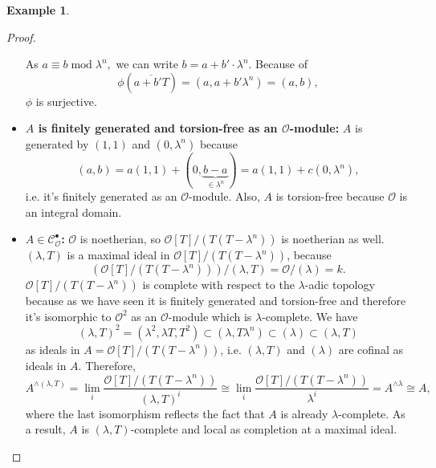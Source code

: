 \documentclass{article}
\theoremstyle{plain}%
\theoremstyle{definition}
\newtheorem{example}[theorem]{Example}
\theoremstyle{remark}
\newcommand{\cob}{\mathcal{C}_\mathcal{O}^\bullet}
\begin{document}
\begin{example}
\begin{proof}
\begin{itemize}
                As \(a \equiv b \operatorname{mod} \lambda^n,\) we can write \(b = a + b' \cdot \lambda^n\). 
                Because of
                \[\phi(\overline{a + b'T}) = (a, a + b' \lambda^n) = (a,b),\] 
                \(\phi\) is surjective.
            \item \textbf{\(A\) is finitely generated and torsion-free as an \(\mathcal{O}\)-module:}
                \(A\) is generated by \((1,1)\) and \((0, \lambda^n)\) because
                \[
                    (a,b) = a(1,1) + (0, \underbrace{b-a}_{\in \lambda^n}) = a(1,1) + c(0, \lambda^n),
                \]
                i.e. it's finitely generated as an \(\mathcal{O}\)-module.
                Also, \(A\) is torsion-free because \(\mathcal{O}\) is an integral domain. 
            \item \textbf{\(A\in \cob\):}
                \(\mathcal{O}\) is noetherian, so \(\mathcal{O}[T]/(T(T-\lambda^n))\) is noetherian as well.
                \((\lambda, T)\) is a maximal ideal in \(\mathcal{O}[T]/(T(T-\lambda^n))\), because
                \[\left(\mathcal{O}[T]/(T(T-\lambda^n))\right)/(\lambda, T) = \mathcal{O}/(\lambda) = k.\]
                \(\mathcal{O}[T]/(T(T-\lambda^n))\) is complete with respect to the \(\lambda\)-adic
                topology because as we have seen it is finitely generated and torsion-free and
                therefore it's isomorphic to \(\mathcal{O}^2\) as an \(\mathcal{O}\)-module
                which is \(\lambda\)-complete.
                We have
                \[
                    (\lambda,T)^2=(\lambda^2,\lambda T,T^2)\subset (\lambda,T\lambda^n)\subset(\lambda)\subset (\lambda,T)
                \]
                as ideals in \(A = \mathcal{O}[T]/(T(T-\lambda^n))\),
                i.e. \((\lambda, T)\) and \((\lambda)\) are cofinal as ideals in \(A\).
                Therefore,
                \[
                    A^{\wedge (\lambda, T)} = \lim\limits_{i} \frac{\mathcal{O}[T]/(T(T-\lambda^n))}{(\lambda, T)^i} 
                    \cong \lim\limits_{i} \frac{\mathcal{O}[T]/(T(T-\lambda^n))}{\lambda^i} = A^{\wedge \lambda} \cong A,
                \]
                where the last isomorphism reflects the fact that \(A\) is already \(\lambda\)-complete.
                As a result, \(A\) is \((\lambda, T)\)-complete and local 
                as completion at a maximal ideal. %

\end{itemize}
\end{proof}
\end{example}
\end{document}
